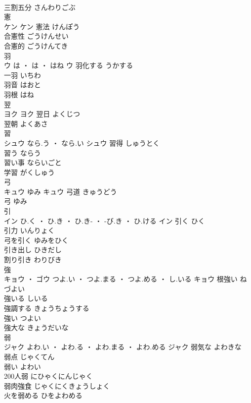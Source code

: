 \documentclass[8pt]{extreport}
\begin{document}
\begin{CJK}{UTF8}{min}
\\	三割五分	さんわりごぶ	
\\	憲	
\\	ケン		ケン	憲法	けんぽう	
\\	合憲性	ごうけんせい	
\\	合憲的	ごうけんてき	
\\	羽	
\\	ウ	は ・ は ・ はね	ウ	羽化する	うかする	
\\	一羽	いちわ	
\\	羽音	はおと	
\\	羽根	はね	
\\	翌	
\\	ヨク		ヨク	翌日	よくじつ	
\\	翌朝	よくあさ	
\\	習	
\\	シュウ	なら.う ・ なら.い	シュウ	習得	しゅうとく	
\\	習う	ならう	
\\	習い事	ならいごと	
\\	学習	がくしゅう	
\\	弓	
\\	キュウ	ゆみ	キュウ	弓道	きゅうどう	
\\	弓	ゆみ	
\\	引	
\\	イン	ひ.く ・ ひ.き ・ ひ.き- ・ -び.き ・ ひ.ける	イン	引く	ひく	
\\	引力	いんりょく	
\\	弓を引く	ゆみをひく	
\\	引き出し	ひきだし	
\\	割り引き	わりびき	
\\	強	
\\	キョウ ・ ゴウ	つよ.い ・ つよ.まる ・ つよ.める ・ し.いる	キョウ	根強い	ねづよい	
\\	強いる	しいる	
\\	強調する	きょうちょうする	
\\	強い	つよい	
\\	強大な	きょうだいな	
\\	弱	
\\	ジャク	よわ.い ・ よわ.る ・ よわ.まる ・ よわ.める	ジャク	弱気な	よわきな	
\\	弱点	じゃくてん	
\\	弱い	よわい	
\\	200人弱	にひゃくにんじゃく	
\\	弱肉強食	じゃくにくきょうしょく	
\\	火を弱める	ひをよわめる	

\end{CJK}
\end{document}
